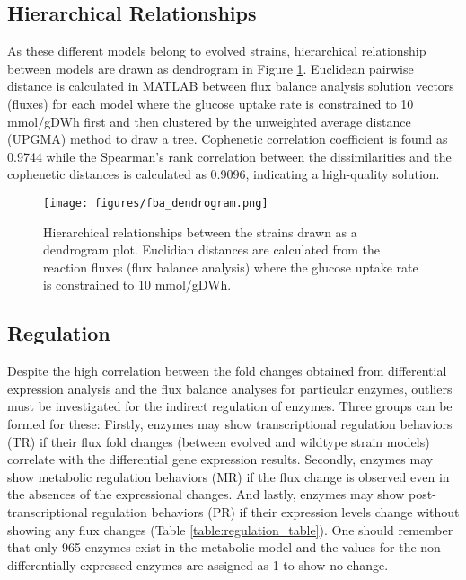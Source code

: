  \subsection{Hierarchical Relationships}

As these different models belong to evolved strains, hierarchical relationship between models are drawn as dendrogram in Figure \ref{fig:fba_dendrogram}. Euclidean pairwise distance is calculated in MATLAB between flux balance analysis solution vectors (fluxes) for each model where the glucose uptake rate is constrained to 10 mmol/gDWh first and then clustered by the unweighted average distance (UPGMA) method to draw a tree. Cophenetic correlation coefficient is found as 0.9744 while the Spearman's rank correlation between the dissimilarities and the cophenetic distances is calculated as 0.9096, indicating a high-quality solution.

\begin{figure}[H]
  \begin{center}
  \texttt{[image: figures/fba\_dendrogram.png]}
  \caption[Hierarchical relationships between the strains drawn as a dendrogram plot. Euclidian distances are calculated from the reaction fluxes (flux balance analysis) where the glucose uptake rate is constrained to 10 mmol/gDWh]{Hierarchical relationships between the strains drawn as a dendrogram plot. Euclidian distances are calculated from the reaction fluxes (flux balance analysis) where the glucose uptake rate is constrained to 10 mmol/gDWh.}
  \label{fig:fba_dendrogram}
  \end{center}
\end{figure}

\subsection{Regulation}

Despite the high correlation between the fold changes obtained from differential expression analysis and the flux balance analyses for particular enzymes, outliers must be investigated for the indirect regulation of enzymes. Three groups can be formed for these: Firstly, enzymes may show transcriptional regulation behaviors (TR) if their flux fold changes (between evolved and wildtype strain models) correlate with the differential gene expression results. Secondly, enzymes may show metabolic regulation behaviors (MR) if the flux change is observed even in the absences of the expressional changes. And lastly, enzymes may show post-transcriptional regulation behaviors (PR) if their expression levels change without showing any flux changes (Table \ref{table:regulation_table}). One should remember that only 965 enzymes exist in the metabolic model and the values for the non-differentially expressed enzymes are assigned as 1 to show no change.

